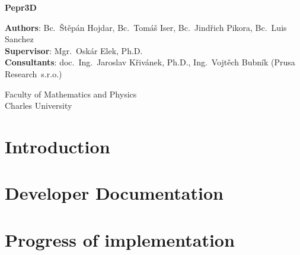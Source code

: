 \documentclass[12pt,a4paper]{report}
\begin{document}
\begin{titlepage}
    \begin{center}
        \vspace*{1cm}

        \Huge
        \textbf{Pepr3D}

        \LARGE

        \vspace{12cm}

		\Large
        \textbf{Authors}:
        Bc.~Štěpán Hojdar,
        Bc.~Tomáš Iser,
        Bc.~Jindřich Pikora,
		Bc.~Luis Sanchez
		\\
		\textbf{Supervisor}: Mgr.~Oskár Elek, Ph.D.
		\\
		\textbf{Consultants}: doc.~Ing.~Jaroslav Křivánek, Ph.D., Ing.~Vojtěch Bubník (Prusa Research~s.r.o.)

        \vfill

		Faculty of Mathematics and Physics \\
		Charles University
    \end{center}
\end{titlepage}

\setcounter{tocdepth}{1}
\tableofcontents

\part{Introduction}





\part{Developer Documentation}








\part{Progress of implementation}
\end{document}

